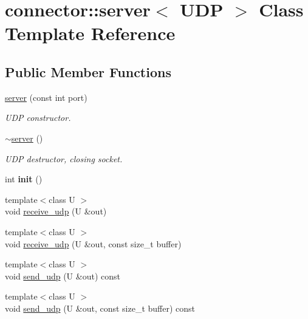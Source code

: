 \hypertarget{classconnector_1_1server_3_01UDP_01_4}{}\section{connector\+:\+:server$<$ U\+DP $>$ Class Template Reference}
\label{classconnector_1_1server_3_01UDP_01_4}
\subsection*{Public Member Functions}
\begin{DoxyCompactItemize}
\item 
\mbox{\label{classconnector_1_1server_3_01UDP_01_4_a87bd3c7f015d64676018c281ad19ffbe}} 
\hyperlink{classconnector_1_1server_3_01UDP_01_4_a87bd3c7f015d64676018c281ad19ffbe}{server} (const int port)
\begin{DoxyCompactList}\small\item\em U\+DP constructor. \end{DoxyCompactList}\item 
\mbox{\label{classconnector_1_1server_3_01UDP_01_4_aa4c6c120ce00364990eb960c0618eb1c}} 
\hyperlink{classconnector_1_1server_3_01UDP_01_4_aa4c6c120ce00364990eb960c0618eb1c}{$\sim$server} ()
\begin{DoxyCompactList}\small\item\em U\+DP destructor, closing socket. \end{DoxyCompactList}\item 
\mbox{\label{classconnector_1_1server_3_01UDP_01_4_ac8a2313bff33df34261f14ef29a50bda}} 
int {\bfseries init} ()
\item 
{\footnotesize template$<$class U $>$ }\\void \hyperlink{classconnector_1_1server_3_01UDP_01_4_a98b7f94a6d4843e115c6fe32e3a2f4bd}{receive\+\_\+udp} (U \&out)
\item 
{\footnotesize template$<$class U $>$ }\\void \hyperlink{classconnector_1_1server_3_01UDP_01_4_af6b853682811e4bd66c4223215cb8e75}{receive\+\_\+udp} (U \&out, const size\+\_\+t buffer)
\item 
{\footnotesize template$<$class U $>$ }\\void \hyperlink{classconnector_1_1server_3_01UDP_01_4_a404605c453a69e8faabf1aad3c3c606a}{send\+\_\+udp} (U \&out) const
\item 
{\footnotesize template$<$class U $>$ }\\void \hyperlink{classconnector_1_1server_3_01UDP_01_4_a9559c1ceb62c8c1ef79046b6f1646f8d}{send\+\_\+udp} (U \&out, const size\+\_\+t buffer) const
\end{DoxyCompactItemize}
